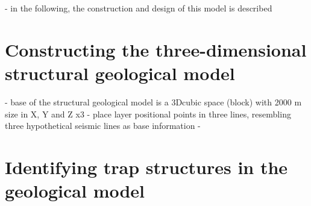 - in the following, the construction and design of this model is described

	\section{Constructing the three-dimensional structural geological model}
	- base of the structural geological model is a 3Dcubic  space (block)  with 2000 m size in X, Y and Z x3
	- place layer positional points in three lines, resembling three hypothetical seismic lines as base information
	-  
	
	\section{Identifying trap structures in the geological model}